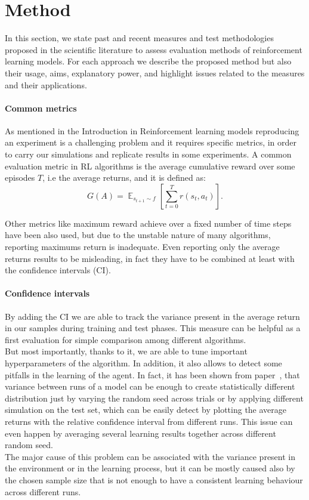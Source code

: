 \documentclass{article}
\DeclareMathOperator{\EX}{\mathbb{E}}%
\begin{document}
\section{Method}
In this section, we state past and recent measures and test methodologies proposed in the scientific literature to assess evaluation methods of reinforcement learning models. For each approach we describe the proposed method but also their usage, aims, explanatory power, and highlight issues related to the measures and their applications.
\paragraph{Common metrics}
As mentioned in the Introduction in Reinforcement learning models reproducing an experiment is a challenging problem and it requires specific metrics, in order to carry our simulations and replicate results in some experiments.
A common evaluation metric in RL algorithms is the average cumulative reward over some episodes $T$, i.e the average returns, and it is defined as:	
\begin{equation}
G(A) = \EX_{s_{t+1} \sim f} \left[\sum_{t=0}^{T} r(s_t, a_t)\right].	
\end{equation}

Other metrics like maximum reward achieve over a fixed number of time steps have been also used, but  due to the unstable nature of many algorithms, reporting maximums return is inadequate. Even reporting only the average returns results to be misleading, in fact they have to be combined at least with the confidence intervals (CI).
\paragraph{Confidence intervals}
By adding the CI we are able to track the variance present in the average return in our samples during training and test phases. This measure can be helpful as a first evaluation for simple comparison among different algorithms.\\ But most importantly, thanks to it, we are able to tune important hyperparameters of the algorithm. In addition, it also allows to detect some pitfalls in the learning of the agent. In fact, it has been shown from paper~\cite{DRL01}, that variance between runs of a model can be enough to create statistically different distribution just by varying the random seed across trials or by applying different simulation on the test set, which can be easily detect by plotting the average returns with the relative confidence interval from different runs.
This issue can even happen by averaging several learning results together across different random seed.\\
The major cause of this problem can be associated with the variance present in the environment or in the learning process, but it can be mostly caused also by the chosen sample size that is not enough to have a consistent learning behaviour across different runs.
\end{document}
